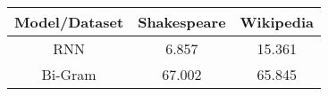 \begin{center}
\begin{tabular}{||c c c||} 
    \hline
    Model/Dataset & Shakespeare & Wikipedia \\ [0.5ex] 
    \hline\hline
    RNN & 6.857 & 15.361 \\ 
    \hline
    Bi-Gram & 67.002 & 65.845 \\
    \hline
\end{tabular}
\end{center}